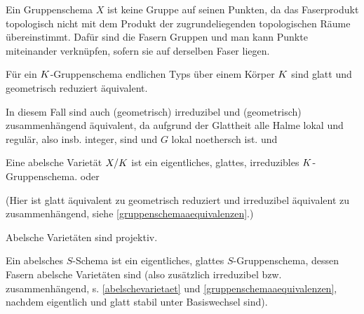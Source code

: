 \documentclass[german]{scrreprt}
\begin{document}
\begin{Definition}[$S$-Gruppenschema]
\begin{Bemerkung}
  Ein Gruppenschema $X$ ist keine Gruppe auf seinen Punkten, da das
  Faserprodukt topologisch nicht mit dem Produkt der zugrundeliegenden
  topologischen Räume übereinstimmt.
  Dafür sind die Fasern Gruppen und man kann Punkte miteinander
  verknüpfen, sofern sie auf derselben Faser liegen.
\end{Bemerkung}

\begin{Bemerkung}\label{gruppenschemaaequivalenzen}
  Für ein $K$-Gruppenschema endlichen Typs über einem Körper $K$
  sind glatt und geometrisch reduziert äquivalent.
  \cite[siehe][8.5, Excercise 11]{bosch}
  
  In diesem Fall sind auch (geometrisch) irreduzibel und (geometrisch)
  zusammenhängend äquivalent, da aufgrund der Glattheit alle Halme
  lokal und regulär, also insb. integer, sind und $G$ lokal noethersch
  ist.
  \cite[s.][Exercise 3.16]{wedhorn} und \cite[siehe][Corollary 16.51]{wedhorn}
\end{Bemerkung}
\end{Definition}


\begin{Definition}\label{abelschevarietaet}
Eine abelsche Varietät $X/K$ ist ein eigentliches, glattes,
irreduzibles $K$-Gruppenschema.
\cite[siehe][9.6, Definition 1]{bosch} oder \cite[Definition 16.52]{wedhorn}

(Hier ist glatt äquivalent zu geometrisch reduziert und irreduzibel
äquivalent zu zusammenhängend, 
siehe \ref{gruppenschemaaequivalenzen}.)

\begin{Bemerkung}
Abelsche Varietäten sind projektiv.
\cite[siehe][9.6, Proposition 4]{bosch}
\end{Bemerkung}
\end{Definition}

\begin{Definition}
Ein abelsches $S$-Schema ist ein eigentliches, glattes $S$-Gruppenschema,
dessen Fasern abelsche Varietäten sind 
(also zusätzlich irreduzibel bzw. zusammenhängend,
s. \ref{abelschevarietaet} und \ref{gruppenschemaaequivalenzen},
nachdem eigentlich und glatt stabil unter Basiswechsel sind).
\end{Definition}
\end{document}
